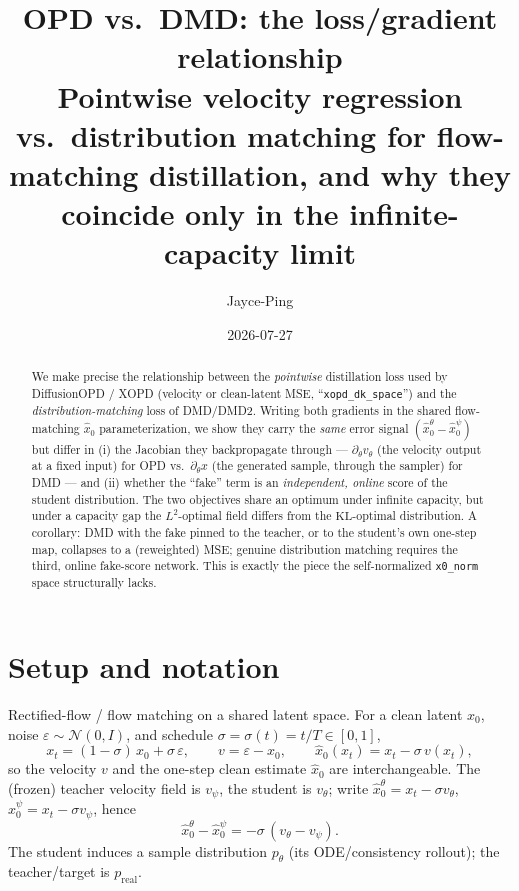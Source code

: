 \documentclass[11pt,a4paper]{article}
\title{\textbf{OPD vs.\ DMD: the loss/gradient relationship}\\[0.3em]
\large Pointwise velocity regression vs.\ distribution matching for
flow-matching distillation, and why they coincide only in the infinite-capacity limit}
\author{Jayce-Ping}
\date{2026-07-27}
\newcommand{\N}{\mathcal{N}}
\newcommand{\KL}{\mathrm{KL}}
\newcommand{\xh}{\hat{x}_0}
\newcommand{\real}{\mathrm{real}}
\begin{document}
\maketitle

\begin{abstract}
We make precise the relationship between the \emph{pointwise} distillation loss used by
DiffusionOPD / XOPD (velocity or clean-latent MSE, ``\texttt{xopd\_dk\_space}'') and the
\emph{distribution-matching} loss of DMD/DMD2. Writing both gradients in the shared flow-matching
$\xh$ parameterization, we show they carry the \emph{same} error signal $(\xh^\theta-\xh^\psi)$ but
differ in (i) the Jacobian they backpropagate through --- $\partial_\theta v_\theta$ (the velocity
output at a fixed input) for OPD vs.\ $\partial_\theta x$ (the generated sample, through the
sampler) for DMD --- and (ii) whether the ``fake'' term is an \emph{independent, online} score of
the student distribution. The two objectives share an optimum under infinite capacity, but under a
capacity gap the $L^2$-optimal field differs from the $\KL$-optimal distribution. A corollary: DMD
with the fake pinned to the teacher, or to the student's own one-step map, collapses to a
(reweighted) MSE; genuine distribution matching requires the third, online fake-score network.
This is exactly the piece the self-normalized \texttt{x0\_norm} space structurally lacks.
\end{abstract}

\section{Setup and notation}
Rectified-flow / flow matching on a shared latent space. For a clean latent $x_0$, noise
$\varepsilon\sim\N(0,I)$, and schedule $\sigma=\sigma(t)=t/T\in[0,1]$,
\begin{equation}
x_t=(1-\sigma)\,x_0+\sigma\,\varepsilon,\qquad
v=\varepsilon-x_0,\qquad
\xh(x_t)=x_t-\sigma\,v(x_t),
\end{equation}
so the velocity $v$ and the one-step clean estimate $\xh$ are interchangeable. The (frozen) teacher
velocity field is $v_\psi$, the student is $v_\theta$; write
$\xh^\theta=x_t-\sigma v_\theta$, $\xh^\psi=x_t-\sigma v_\psi$, hence
\begin{equation}\label{eq:resid}
\xh^\theta-\xh^\psi=-\sigma\,(v_\theta-v_\psi).
\end{equation}
The student induces a sample distribution $p_\theta$ (its ODE/consistency rollout); the teacher/target
is $p_{\real}$.
\end{document}
